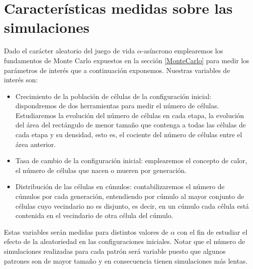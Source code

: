 \documentclass[../proyecto.tex]{memoir}
\begin{document}
\section{Características medidas sobre las simulaciones} \label{vars}

Dado el carácter aleatorio del juego de vida $\alpha$-asíncrono emplearemos los fundamentos de Monte Carlo expuestos en la sección \ref{MonteCarlo} para medir los parámetros de interés que a continuación exponemos. Nuestras variables de interés son:

\begin{itemize}
\item Crecimiento de la población de células de la configuración inicial: dispondremos de dos herramientas para medir el número de células. Estudiaremos la evolución del número de células en cada etapa, la evolución del área del rectángulo de menor tamaño que contenga a todas las células de cada etapa y su densidad, esto es, el cociente del número de células entre el área anterior.
\item Tasa de cambio de la configuración inicial: emplearemos el concepto de calor, el número de células que nacen o mueren por generación.
\item Distribución de las células en cúmulos: contabilizaremos el número de cúmulos por cada generación, entendiendo por cúmulo al mayor conjunto de células cuyo vecindario no es disjunto, es decir, en un cúmulo cada célula está contenida en el vecindario de otra célula del cúmulo.
\end{itemize}

Estas variables serán medidas para distintos valores de $\alpha$ con el fin de estudiar el efecto de la aleatoriedad en las configuraciones iniciales. Notar que el número de simulaciones realizadas para cada patrón será variable puesto que algunos patrones son de mayor tamaño y en consecuencia tienen simulaciones más lentas.

\end{document}
